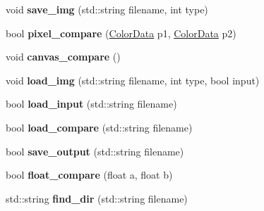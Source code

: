 \begin{DoxyCompactItemize}
\item 
void {\bfseries save\+\_\+img} (std\+::string filename, int type)\hypertarget{classimage__tools_1_1MIACmdApp_a5c38e0afc7a8aad284fb1f3d539cfc73}{}\label{classimage__tools_1_1MIACmdApp_a5c38e0afc7a8aad284fb1f3d539cfc73}

\item 
bool {\bfseries pixel\+\_\+compare} (\hyperlink{classimage__tools_1_1ColorData}{Color\+Data} p1, \hyperlink{classimage__tools_1_1ColorData}{Color\+Data} p2)\hypertarget{classimage__tools_1_1MIACmdApp_a6d1305708716f615406cebae12c4e969}{}\label{classimage__tools_1_1MIACmdApp_a6d1305708716f615406cebae12c4e969}

\item 
void {\bfseries canvas\+\_\+compare} ()\hypertarget{classimage__tools_1_1MIACmdApp_a9610ce985357ba2735e0016b10712805}{}\label{classimage__tools_1_1MIACmdApp_a9610ce985357ba2735e0016b10712805}

\item 
void {\bfseries load\+\_\+img} (std\+::string filename, int type, bool input)\hypertarget{classimage__tools_1_1MIACmdApp_a1f481d87f3b14f58f0e38896b3bb0567}{}\label{classimage__tools_1_1MIACmdApp_a1f481d87f3b14f58f0e38896b3bb0567}

\item 
bool {\bfseries load\+\_\+input} (std\+::string filename)\hypertarget{classimage__tools_1_1MIACmdApp_a72a1dc4a09051134a018f0a397f1a69a}{}\label{classimage__tools_1_1MIACmdApp_a72a1dc4a09051134a018f0a397f1a69a}

\item 
bool {\bfseries load\+\_\+compare} (std\+::string filename)\hypertarget{classimage__tools_1_1MIACmdApp_a27a55aa62b219fe8a1d665bf32571eae}{}\label{classimage__tools_1_1MIACmdApp_a27a55aa62b219fe8a1d665bf32571eae}

\item 
bool {\bfseries save\+\_\+output} (std\+::string filename)\hypertarget{classimage__tools_1_1MIACmdApp_a4cb9833d17079d470eecba973616eceb}{}\label{classimage__tools_1_1MIACmdApp_a4cb9833d17079d470eecba973616eceb}

\item 
bool {\bfseries float\+\_\+compare} (float a, float b)\hypertarget{classimage__tools_1_1MIACmdApp_a4564cb46a28938086ade063377ceb467}{}\label{classimage__tools_1_1MIACmdApp_a4564cb46a28938086ade063377ceb467}

\item 
std\+::string {\bfseries find\+\_\+dir} (std\+::string filename)\hypertarget{classimage__tools_1_1MIACmdApp_a9be7a9dd13a3c85c81d1bc219db77f6f}{}\label{classimage__tools_1_1MIACmdApp_a9be7a9dd13a3c85c81d1bc219db77f6f}

\end{DoxyCompactItemize}
